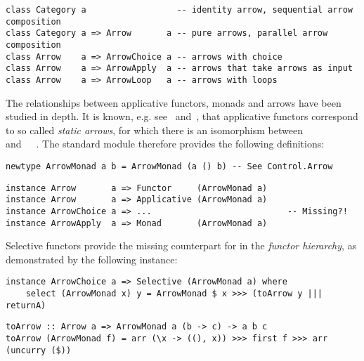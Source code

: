 \vspace{1mm}
\begin{verbatim}
class Category a                  -- identity arrow, sequential arrow composition
class Category a => Arrow       a -- pure arrows, parallel arrow composition
class Arrow    a => ArrowChoice a -- arrows with choice
class Arrow    a => ArrowApply  a -- arrows that take arrows as input
class Arrow    a => ArrowLoop   a -- arrows with loops
\end{verbatim}
\vspace{1mm}

\noindent
The relationships between applicative functors, monads and arrows have been
studied in depth. It is known, e.g. see~\citet{lindley2011idioms}
and~\citet{rivas2017notions}, that applicative functors correspond to so called
\emph{static arrows}, for which there is an isomorphism between
~\hs{()}~\hs{(}~\hs{->}~ and~~~. The
standard module  therefore provides the following
definitions:

\vspace{1mm}
\begin{verbatim}
newtype ArrowMonad a b = ArrowMonad (a () b) -- See Control.Arrow
\end{verbatim}
\vspace{1mm}
\begin{verbatim}
instance Arrow       a => Functor     (ArrowMonad a)
instance Arrow       a => Applicative (ArrowMonad a)
instance ArrowChoice a => ...                           -- Missing?!
instance ArrowApply  a => Monad       (ArrowMonad a)
\end{verbatim}
\vspace{1mm}

\noindent
Selective functors provide the missing counterpart for  in the
\emph{functor hierarchy}, as demonstrated by the following instance:

\vspace{1mm}
\begin{verbatim}
instance ArrowChoice a => Selective (ArrowMonad a) where
    select (ArrowMonad x) y = ArrowMonad $ x >>> (toArrow y ||| returnA)
\end{verbatim}
\vspace{1mm}
\begin{verbatim}
toArrow :: Arrow a => ArrowMonad a (b -> c) -> a b c
toArrow (ArrowMonad f) = arr (\x -> ((), x)) >>> first f >>> arr (uncurry ($))
\end{verbatim}
\vspace{1mm}

